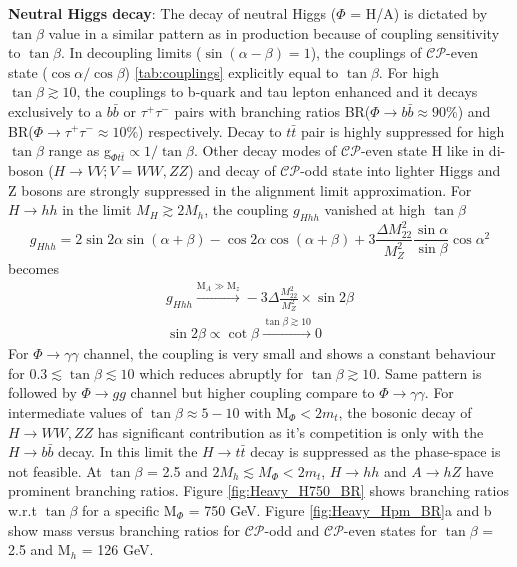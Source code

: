 \noindent\textbf{Neutral Higgs decay}: The decay of neutral Higgs ($\Phi$ = H/A) is dictated by $\tan\beta$ value in a similar pattern as in production because of coupling sensitivity to $\tan\beta$. In decoupling limits ($\sin\left(\alpha-\beta\right) = 1$), the couplings of $\mathcal{CP}$-even state ($\cos\alpha/\cos\beta$) \ref{tab:couplings} explicitly equal to $\tan\beta$. For high $\tan\beta \gtrsim 10$, the couplings to b-quark and tau lepton enhanced and it decays exclusively to a $b\bar{b}$ or $\tau^{+}\tau^{-}$ pairs with branching ratios BR($\Phi\rightarrow b\bar{b} \approx 90\%$) and BR($\Phi\rightarrow \tau^{+}\tau^{-} \approx 10\%$) respectively. Decay to $t\bar{t}$ pair is highly suppressed for high $\tan\beta$ range as g$_{\Phi t\bar{t}} \propto 1/\tan\beta$. Other decay modes of $\mathcal{CP}$-even state H like in di-boson ($H\rightarrow VV; V= WW, ZZ$) and decay of $\mathcal{CP}$-odd state into lighter Higgs and Z bosons are strongly suppressed in the alignment limit approximation. For $H\rightarrow hh$ in the limit $M_{H}\gtrsim 2M_{h}$, the coupling $g_{Hhh}$ vanished at high $\tan\beta$ \cite{Baglio:2015wcg} 
\begin{equation}
g_{Hhh} = 2\sin2\alpha \sin\left(\alpha+\beta\right)-\cos2\alpha\cos\left(\alpha+\beta\right)+3\frac{\Delta M^{2}_{22}}{M^{2}_{Z}}\frac{\sin\alpha}{\sin\beta}\cos\alpha^{2}
\end{equation}
becomes
\begin{equation}
\begin{split}
g_{Hhh} \xrightarrow{\text{M}_{A}\gg \text{M}_{z}} -3\Delta \frac{M^{2}_{22}}{M_{Z}^{2}}\times \sin2\beta\\
\sin2\beta \propto \cot\beta \xrightarrow{\tan\beta \gtrsim 10} 0
\end{split} 
\end{equation}  
For $\Phi\rightarrow \gamma\gamma$ channel, the coupling is very small and shows a constant behaviour for $0.3\lesssim \tan\beta \lesssim 10$ which reduces abruptly for $\tan\beta \gtrsim 10$. Same pattern is followed by $\Phi \rightarrow gg$ channel but higher coupling compare to $\Phi\rightarrow \gamma\gamma$. For intermediate values of $\tan\beta \approx 5-10$ with M$_{\Phi} < 2m_{t}$, the bosonic decay of $H\rightarrow WW, ZZ$ has significant contribution as it's competition is only with the $H\rightarrow b\bar{b}$ decay. In this limit the $H\rightarrow t\bar{t}$ decay is suppressed as the phase-space is not feasible. At $\tan\beta$ = 2.5 and $2M_{h} \lesssim M_{\Phi}< 2m_{t}$, $H\rightarrow hh$ and $A\rightarrow hZ$ have prominent branching ratios. Figure \ref{fig:Heavy_H750_BR} shows branching ratios w.r.t $\tan\beta$ for a specific M$_{\Phi}$ = 750 GeV. Figure \ref{fig:Heavy_Hpm_BR}a and b show mass versus branching ratios for $\mathcal{CP}$-odd and $\mathcal{CP}$-even states for $\tan\beta$ = 2.5 and M$_{h}$ = 126 GeV. 
